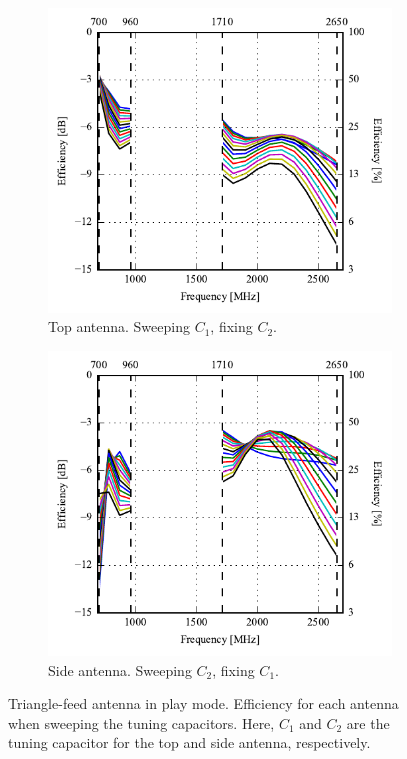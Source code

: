 \begin{figure}[htbp]
    \centering
    \begin{subfigure}{0.49\linewidth}
        \centering
        \includegraphics{img/tech_sol/trianglefeed/play_mode/efficiency-ac1-Csh1.pdf}
        \caption{Top antenna. Sweeping $C_1$, fixing $C_2$.}
    \end{subfigure}
    \hfill
    \begin{subfigure}{0.49\linewidth}
        \centering
        \includegraphics{img/tech_sol/trianglefeed/play_mode/efficiency-ac2-Csh2.pdf}
        \caption{Side antenna. Sweeping $C_2$, fixing $C_1$.}
    \end{subfigure}
    \caption{Triangle-feed antenna in play mode. Efficiency for each antenna when sweeping the tuning capacitors. Here, $C_1$ and $C_2$ are the tuning capacitor for the top and side antenna, respectively.}
    \label{fig:eff_sol2play}
\end{figure}

